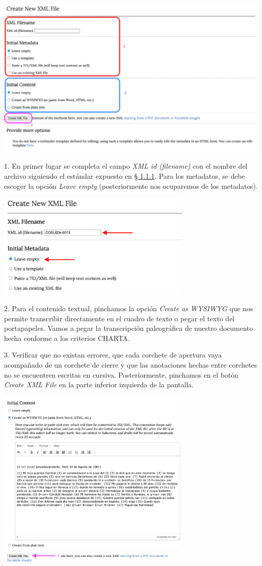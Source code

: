 \documentclass[
]{book}
\begin{document}
\includegraphics{img/crear.png}

{1.} En primer lugar se completa el campo \emph{XML id (filename)} con el nombre del archivo siguiendo el estándar expuesto en \protect\hyperlink{head1234}{§ 1.1.1}. Para los metadatos, se debe escoger la opción \emph{Leave empty} (posteriormente nos ocuparemos de los metadatos).

\includegraphics[width=0.7\textwidth,height=\textheight]{img/nombre.png}

{2.} Para el contenido textual, pinchamos la opción \emph{Create as WYSIWYG} que nos permite transcribir directamente en el cuadro de texto o pegar el texto del portapapeles. Vamos a pegar la transcripción paleográfica de nuestro documento hecha conforme a los criterios CHARTA.

{3.} Verificar que no existan errores, que cada corchete de apertura vaya acompañado de un corchete de cierre y que las anotaciones hechas entre corchetes no se encuentren escritas en cursiva. Posteriormente, pinchamos en el botón \emph{Create XML File} en la parte inferior izquierda de la pantalla.

\includegraphics[width=0.7\textwidth,height=\textheight]{img/tp.png}
\end{document}
